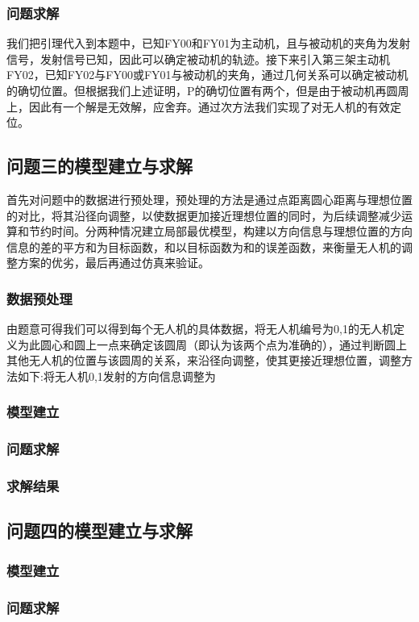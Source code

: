 \documentclass[withoutpreface,bwprint]{cumcmthesis} %
\begin{document}
\subsubsection{问题求解}
我们把引理代入到本题中，已知FY00和FY01为主动机，且与被动机的夹角为发射信号，发射信号已知，因此可以确定被动机的轨迹。接下来引入第三架主动机FY02，已知FY02与FY00或FY01与被动机的夹角，通过几何关系可以确定被动机的确切位置。但根据我们上述证明，P的确切位置有两个，但是由于被动机再圆周上，因此有一个解是无效解，应舍弃。通过次方法我们实现了对无人机的有效定位。



\subsection{问题三的模型建立与求解}
首先对问题中的数据进行预处理，预处理的方法是通过点距离圆心距离与理想位置的对比，将其沿径向调整，以使数据更加接近理想位置的同时，为后续调整减少运算和节约时间。分两种情况建立局部最优模型，构建以方向信息与理想位置的方向信息的差的平方和为目标函数，和以目标函数为和的误差函数，来衡量无人机的调整方案的优劣，最后再通过仿真来验证。
\subsubsection{数据预处理}
由题意可得我们可以得到每个无人机的具体数据，将无人机编号为0,1的无人机定义为此圆心和圆上一点来确定该圆周（即认为该两个点为准确的），通过判断圆上其他无人机的位置与该圆周的关系，来沿径向调整，使其更接近理想位置，调整方法如下:将无人机0,1发射的方向信息调整为
\subsubsection{模型建立}
\subsubsection{问题求解}
\subsubsection{求解结果}


\subsection{问题四的模型建立与求解}
\subsubsection{模型建立}
\subsubsection{问题求解}
\end{document}

